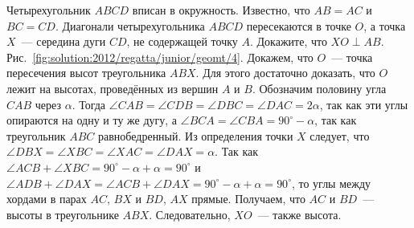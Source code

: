 \problem
Четырехугольник $ABCD$ вписан в окружность.
Известно, что $AB = AC$ и $BC = CD$.
Диагонали четырехугольника $ABCD$ пересекаются в точке $O$, а точка $X$~---
середина дуги $CD$, не содержащей точку $A$. Докажите, что $XO \perp AB$.
%
\label{solution:2012/regatta/junior/geomt/4}%
Рис.~\ref{fig:solution:2012/regatta/junior/geomt/4}.
Докажем, что $O$~--- точка пересечения высот треугольника $ABX$.
Для этого достаточно доказать, что $O$ лежит на высотах, проведённых из вершин
$A$ и $B$.
Обозначим половину угла $CAB$ через $\alpha$.
Тогда
$\angle CAB = \angle CDB = \angle DBC = \angle DAC = 2 \alpha$,
так как эти углы опираются на одну и ту же дугу, а
$\angle BCA = \angle CBA = 90^\circ - \alpha$,
так как треугольник $ABC$ равнобедренный.
Из определения точки $X$ следует, что
$\angle DBX = \angle XBC = \angle XAC = \angle DAX = \alpha$.
Так как
\(
    \angle ACB + \angle XBC
=
    90^\circ - \alpha + \alpha
=
    90^\circ
\)
и
\(
    \angle ADB + \angle DAX
=
    \angle ACB + \angle DAX
=
    90^\circ - \alpha + \alpha
=
    90^\circ
\),
то углы между хордами в парах $AC$, $BX$ и $BD$, $AX$ прямые.
Получаем, что $AC$ и $BD$~--- высоты в треугольнике $ABX$.
Следовательно, $XO$~--- также высота.
\endproblem

